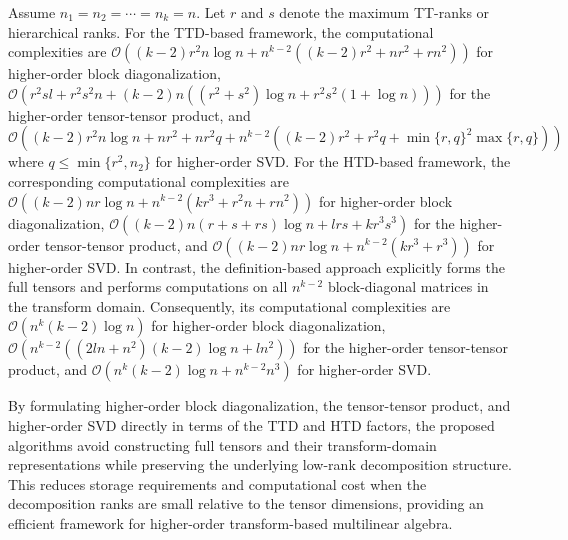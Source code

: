 \documentclass[onefignum,onetabnum]{siamart250211}
\begin{document}
\begin{remark}
Assume $n_1=n_2=\cdots=n_k=n$. Let $r$ and $s$ denote the maximum TT-ranks or hierarchical ranks. For the TTD-based framework, the computational complexities are $\mathcal{O}((k-2)r^2n\log n+n^{k-2}((k-2)r^2+nr^2 + rn^2))$ for higher-order block diagonalization, $\mathcal{O}(r^2sl + r^2s^2n+(k-2)n((r^2+s^2)\log n+r^2s^2(1+\log n)))$ for the higher-order tensor-tensor product, and
$\mathcal{O}((k-2)r^2n\log n + nr^2 + nr^2q + n^{k-2}((k-2)r^2 + r^2q + \min \{r, q\}^2\max\{r, q\}))$ where $q \leq \min\{r^2, n_2\}$ for higher-order SVD.
For the HTD-based framework, the corresponding computational complexities are $\mathcal{O}((k-2)nr\log n+n^{k-2}(kr^3+r^2n+rn^2))$ for higher-order block diagonalization, $\mathcal{O}((k-2)n(r+s+rs)\log n+lrs+kr^3s^3)$ for the higher-order tensor-tensor product, and $\mathcal{O}((k-2)nr\log n+n^{k-2}(kr^3+r^3))$ for  higher-order SVD.
In contrast, the definition-based approach explicitly forms the full tensors and performs computations on all $n^{k-2}$ block-diagonal matrices in the transform domain. Consequently, its computational complexities are $\mathcal{O}(n^k(k-2)\log n)$ for higher-order block diagonalization, $\mathcal{O}(n^{k-2}((2ln+n^2)(k-2)\log n+ln^2))$ for the higher-order tensor-tensor product, and $\mathcal{O}(n^k(k-2)\log n+n^{k-2}n^3)$ for  higher-order SVD.
\end{remark}


By formulating higher-order block diagonalization, the tensor-tensor product, and higher-order SVD directly in terms of the TTD and HTD factors, the proposed algorithms avoid constructing full tensors and their transform-domain representations while preserving the underlying low-rank decomposition structure. This reduces storage requirements and computational cost when the decomposition ranks are small relative to the tensor dimensions, providing an efficient framework for higher-order transform-based multilinear algebra.
\end{document}
